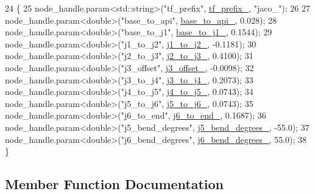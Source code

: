 \begin{DoxyCode}
24 \{
25     node\_handle.param<std::string>(\textcolor{stringliteral}{"tf\_prefix"}, \hyperlink{classjaco_1_1JacoKinematics_a0efb1f0ad1937553c7e285b27da0bdd3}{tf\_prefix\_}, \textcolor{stringliteral}{"jaco\_"});
26 
27     node\_handle.param<\textcolor{keywordtype}{double}>(\textcolor{stringliteral}{"base\_to\_api"}, \hyperlink{classjaco_1_1JacoKinematics_a4edc270c1506293993ed77f04409045c}{base\_to\_api\_}, 0.028);
28     node\_handle.param<\textcolor{keywordtype}{double}>(\textcolor{stringliteral}{"base\_to\_j1"}, \hyperlink{classjaco_1_1JacoKinematics_a7f67ac2a11176769a3477924f46c7284}{base\_to\_j1\_}, 0.1544);
29     node\_handle.param<\textcolor{keywordtype}{double}>(\textcolor{stringliteral}{"j1\_to\_j2"}, \hyperlink{classjaco_1_1JacoKinematics_af9545eaea2e16deaaeea5c1e4db27fe2}{j1\_to\_j2\_}, -0.1181);
30     node\_handle.param<\textcolor{keywordtype}{double}>(\textcolor{stringliteral}{"j2\_to\_j3"}, \hyperlink{classjaco_1_1JacoKinematics_ab19fccf28da90214c1aab8f11f1e7b42}{j2\_to\_j3\_}, 0.4100);
31     node\_handle.param<\textcolor{keywordtype}{double}>(\textcolor{stringliteral}{"j3\_offset"}, \hyperlink{classjaco_1_1JacoKinematics_ae9e4c7a1d4e000d1697465f2f7ba4a12}{j3\_offset\_}, -0.0098);
32     node\_handle.param<\textcolor{keywordtype}{double}>(\textcolor{stringliteral}{"j3\_to\_j4"}, \hyperlink{classjaco_1_1JacoKinematics_a873308257c7953e6e98b3229766ee8a4}{j3\_to\_j4\_}, 0.2073);
33     node\_handle.param<\textcolor{keywordtype}{double}>(\textcolor{stringliteral}{"j4\_to\_j5"}, \hyperlink{classjaco_1_1JacoKinematics_a5e322eafc0b3b827ae1713d24178c1f8}{j4\_to\_j5\_}, 0.0743);
34     node\_handle.param<\textcolor{keywordtype}{double}>(\textcolor{stringliteral}{"j5\_to\_j6"}, \hyperlink{classjaco_1_1JacoKinematics_a156f585f21c8495d3772fb872cace39e}{j5\_to\_j6\_}, 0.0743);
35     node\_handle.param<\textcolor{keywordtype}{double}>(\textcolor{stringliteral}{"j6\_to\_end"}, \hyperlink{classjaco_1_1JacoKinematics_a9e7969fbd9647524c0eef9b8f2ab0f1f}{j6\_to\_end\_}, 0.1687);
36     node\_handle.param<\textcolor{keywordtype}{double}>(\textcolor{stringliteral}{"j5\_bend\_degrees"}, \hyperlink{classjaco_1_1JacoKinematics_ad309e89a6e5c60e0f614629c5f1b4c79}{j5\_bend\_degrees\_}, -55.0);
37     node\_handle.param<\textcolor{keywordtype}{double}>(\textcolor{stringliteral}{"j6\_bend\_degrees"}, \hyperlink{classjaco_1_1JacoKinematics_a41a21f1b560c3387855f15059a619994}{j6\_bend\_degrees\_}, 55.0);
38 \}
\end{DoxyCode}


\subsection{Member Function Documentation}
